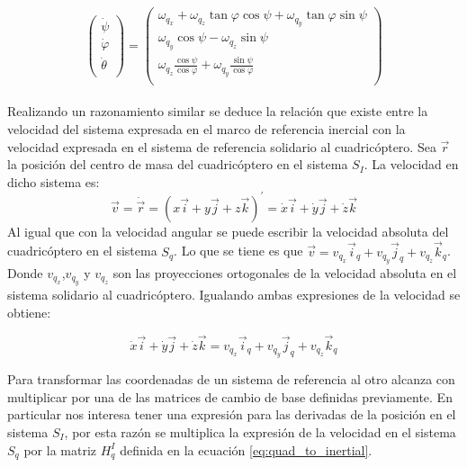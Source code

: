 \documentclass[main]{subfiles}
\begin{document}
\begin{equation}
\left(\begin{array}{c}
\dot{\psi}\\
\dot{\varphi}\\
\dot{\theta}\\
\end{array}\right)=\left(\begin{array}{c}
\omega_{q_x} + \omega_{q_z}\tan\varphi \cos\psi + \omega_{q_y}\tan\varphi \sin\psi\\
\omega_{q_y}\cos \psi - \omega_{q_z}\sin\psi\\
\omega_{q_z} \frac{\cos\psi}{\cos\varphi}  + \omega_{q_y}\frac{\sin\psi}{\cos\varphi} \\
\end{array}\right)
\label{eq:euler}
\end{equation}\\

Realizando un razonamiento similar se deduce la relaci\'on que existe entre la velocidad del sistema expresada en el marco de referencia inercial con la velocidad expresada en el sistema de referencia solidario al cuadric\'optero. Sea $\vec{r}$ la posici\'on del centro de masa del cuadric\'optero en el sistema $S_I$. La velocidad en dicho sistema es:
\begin{equation}
\vec{v}=\dot{\vec{r}}=(x\vec{i}+y\vec{j}+z\vec{k})^\prime=\dot{x}\vec{i}+\dot{y}\vec{j}+\dot{z}\vec{k}
\end{equation}
Al igual que con la velocidad angular se puede escribir la velocidad absoluta del cuadric\'optero en el sistema $S_q$. Lo que se tiene es que $\vec{v} =v_{q_x}\vec{i}_q+v_{q_y}\vec{j}_q+v_{q_z}\vec{k}_q$. Donde $v_{q_x}$,$v_{q_y}$ y $v_{q_z}$ son las proyecciones ortogonales de la velocidad absoluta en el sistema solidario al cuadric\'optero. Igualando ambas expresiones de la velocidad se obtiene: 

\begin{equation}
\dot{x}\vec{i}+\dot{y}\vec{j}+\dot{z}\vec{k} = v_{q_x} \vec{i}_q+v_{q_y} \vec{j}_q+v_{q_z} \vec{k}_q
\end{equation}

Para transformar las coordenadas de un sistema de referencia al otro alcanza con multiplicar por una de las matrices de cambio de base definidas previamente. En particular nos interesa tener una expresi\'on para las derivadas de la posici\'on en el sistema $S_I$, por esta raz\'on se multiplica la expresi\'on de la velocidad en el sistema $S_q$ por la matriz $H_q^I$ definida en la ecuaci\'on \ref{eq:quad_to_inertial}. 
\end{document}
